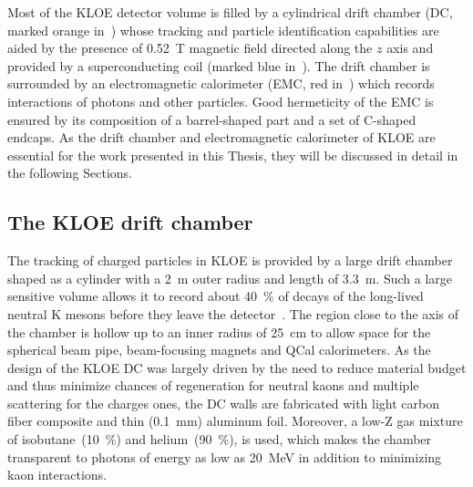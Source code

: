 Most of the KLOE detector volume is filled by a cylindrical drift chamber (DC, marked orange in~) whose tracking and particle identification capabilities are aided by the presence of 0.52~T magnetic field directed along the $z$ axis and provided by a superconducting coil (marked blue in~). The drift chamber is surrounded by an electromagnetic calorimeter (EMC, red in~) which records interactions of photons and other particles. Good hermeticity of the EMC is ensured by its composition of a barrel-shaped part and a set of C-shaped endcaps. As the drift chamber and electromagnetic calorimeter of KLOE are essential for the work presented in this Thesis, they will be discussed in detail in the following Sections.

\subsection{The KLOE drift chamber}
\label{sec:dc}
The tracking of charged particles in KLOE is provided by a large drift chamber shaped as a cylinder with a 2~m outer radius and length of 3.3~m. Such a large sensitive volume allows it to record about \SI{40}{\percent} of decays of the long-lived neutral K mesons before they leave the detector~\cite{LeeFranzini:2007hj}. The region close to the axis of the chamber is hollow up to an inner radius of 25~cm to allow space for the spherical beam pipe, beam-focusing magnets and QCal calorimeters. As the design of the KLOE DC was largely driven by the need to reduce material budget and thus minimize chances of regeneration for neutral kaons and multiple scattering for the charges ones, the DC walls are fabricated with light carbon fiber composite and thin (0.1~mm) aluminum foil. Moreover, a low-Z gas mixture of isobutane~(\SI{10}{\percent}) and helium~(\SI{90}{\percent}), is used, which makes the chamber transparent to photons of energy as low as 20~MeV in addition to minimizing kaon interactions.

